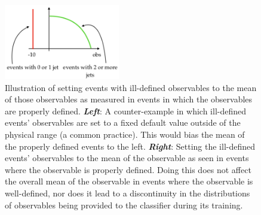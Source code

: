 \begin{figure}[!htb]
    \begin{center}
        \includegraphics[width=0.45\textwidth]{figures/search_hh/mva/nn_feature_illdefined}
        \caption{
            Illustration of setting events with ill-defined observables to the mean of those observables
            as measured in events in which the observables are properly defined.
            \textit{\textbf{Left}}: A counter-example in which ill-defined events' observables are set to a fixed default
                value outside of the physical range (a common practice).
                This would bias the mean of the properly defined events to the left.
            \textit{\textbf{Right}}: Setting the ill-defined events' observables to the mean of the observable
                as seen in events where the observable is properly defined.
                Doing this does not affect the overall mean of the observable in events where the
                observable is well-defined, nor does it lead to a discontinuity in the distributions of observables
                being provided to the classifier during its training.
        }
        \label{fig:nn_feature_means}
    \end{center}
\end{figure}

